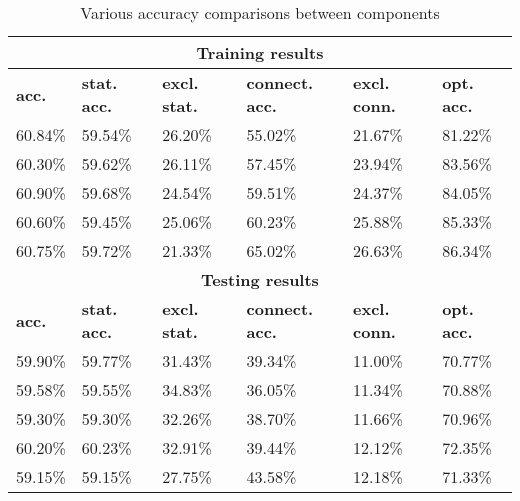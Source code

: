 \begin{table}[htpb]
    \centering 
	\begin{tabular}{|l|l|l|l|l|l|}
		\hline
		\multicolumn{6}{|c|}{\bf Training results } \\ \hline
		{\bf acc.} & {\bf stat. acc.} & {\bf excl. stat.}& {\bf connect. acc. } & {\bf excl. conn. } & {\bf opt. acc.} \\ \hline
		60.84\%	   &  59.54\%    & 26.20\%   &  55.02\%  & 21.67\%   & 81.22\% \\ \hline
		60.30\%    &  59.62\%    & 26.11\%   &  57.45\%  & 23.94\%   & 83.56\% \\ \hline
		60.90\%    &  59.68\%    & 24.54\%   &  59.51\%  & 24.37\%   & 84.05\% \\ \hline
		60.60\%    &  59.45\%    & 25.06\%   &  60.23\%  & 25.88\%   & 85.33\% \\ \hline
		60.75\%    &  59.72\%    & 21.33\%   &  65.02\%  & 26.63\%   & 86.34\% \\ \hline
		\multicolumn{6}{|c|}{\bf Testing results } \\ \hline
		{\bf acc.} & {\bf stat. acc.} & {\bf excl. stat.} & {\bf connect. acc. } & {\bf excl. conn. } & {\bf opt. acc.} \\ \hline
		59.90\%    &  59.77\%   & 31.43\%   &  39.34\%   & 11.00\%   & 70.77\% \\ \hline
		59.58\%    &  59.55\%   & 34.83\%   &  36.05\%   & 11.34\%   & 70.88\% \\ \hline
		59.30\%    &  59.30\%   & 32.26\%   &  38.70\%   & 11.66\%   & 70.96\% \\ \hline
		60.20\%    &  60.23\%   & 32.91\%   &  39.44\%   & 12.12\%   & 72.35\% \\ \hline
		59.15\%    &  59.15\%   & 27.75\%   &  43.58\%   & 12.18\%   & 71.33\% \\ \hline
	\end{tabular}
	\caption{Various accuracy comparisons between components \label{table:ALLACCURACY}}
\end{table}

